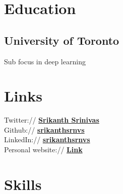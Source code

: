 \documentclass[]{deedy-resume-openfont}
\begin{document}
%
%
\lastupdated

%
%

%
%

\begin{minipage}[t]{0.33\textwidth} 


\section{Education} 

\subsection{University of Toronto}
Sub focus in deep learning
\sectionsep


\section{Links} 
Twitter:// \href{https://www.twitter.com/IamGingerTrash}{\bf Srikanth Srinivas} \\
Github:// \href{https://github.com/srikanthsrnvs}{\bf srikanthsrnvs} \\
LinkedIn://  \href{https://www.linkedin.com/in/srikanthsrnvs/}{\bf srikanthsrnvs} \\
Personal website://  \href{https://srikanthsrnvs.github.io/website/}{\bf Link} \\


\section{Skills}

\end{minipage}
\end{document}
